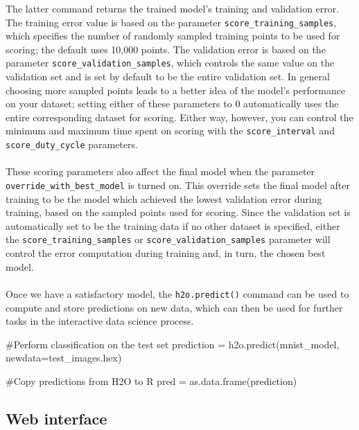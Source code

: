 \documentclass[11pt]{article}
\begin{document}
\noindent
The latter command returns the trained model's training and validation error. The training error value is based on the parameter \texttt{score\_training\_samples}, which specifies the number of randomly sampled training points to be used for scoring; the default uses 10,000 points. The validation error is based on the parameter \texttt{score\_validation\_samples}, which controls the same value on the validation set and is set by default to be the entire validation set.
In general choosing more sampled points leads to a better idea of the model's performance on your dataset; setting either of these parameters to 0 automatically uses the entire corresponding dataset for scoring. Either way, however, you can control the minimum
and maximum time spent on scoring with the \texttt{score\_interval} and \texttt{score\_duty\_cycle} parameters.
\\
\\
These scoring parameters also affect the final model when the parameter \texttt{override\_with\_best\_model} is turned on. This override sets the final model after training to be the model which achieved the lowest validation error during training, based on
the sampled points used for scoring. Since the validation set is automatically set to be the training data if no other dataset is specified, either the \texttt{score\_training\_samples} or \texttt{score\_validation\_samples} parameter will control the error computation
during training and, in turn, the chosen best model.
\\
\\
Once we have a satisfactory model, the \texttt{h2o.predict()} command can be used to compute and store predictions on new data, which can then be used for further tasks in the interactive data science process.
\begin{spverbatim}
#Perform classification on the test set
prediction = h2o.predict(mnist_model, newdata=test_images.hex)

#Copy predictions from H2O to R
pred = as.data.frame(prediction)

\end{spverbatim}


\subsection{Web interface} \label{3.3}
\end{document}
